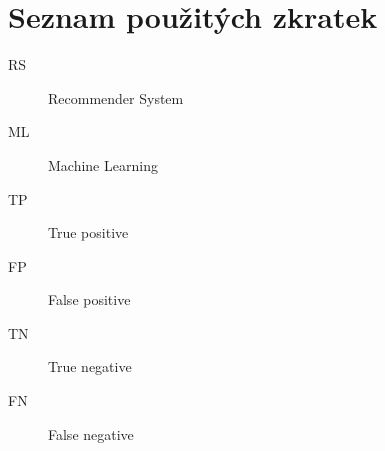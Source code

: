 \chapter*{Seznam použitých zkratek}

\raggedright
\begin{description}
    \item [RS] Recommender System
    \item [ML] Machine Learning
    \item [TP] True positive
    \item [FP] False positive
    \item [TN] True negative
    \item [FN] False negative
\end{description}
